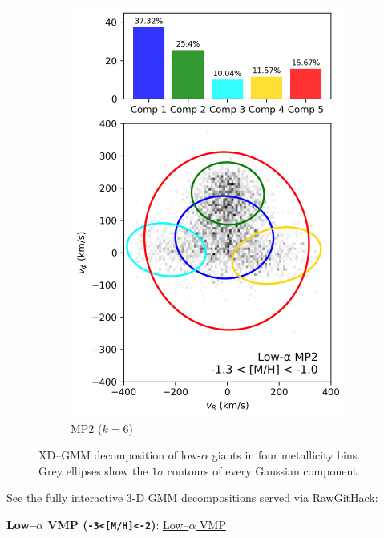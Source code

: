 \documentclass[a4paper,12pt]{article}
\begin{document}
\begin{figure}[H]
\begin{subfigure}{0.24\linewidth}
    \includegraphics[width=\linewidth]{../figures/gmm_mp2_low_alpha_k6.png}
    \caption{MP2 ($k{=}6$)}
    \label{fig:gmm_mp2_lo}
  \end{subfigure}

  \caption{XD–GMM decomposition of low-$\alpha$ giants in four metallicity
           bins.  Grey ellipses show the $1\sigma$ contours of every Gaussian component.}
  \label{fig:gmm_lowalpha_panel}
\end{figure}

See the fully interactive 3-D GMM decompositions served via RawGitHack:\medskip

\noindent\textbf{Low–$\alpha$ VMP (\texttt{-3<[M/H]<-2})}:  
\href{https://raw.githack.com/raunaq-rai/Disentangling-the-Milky-Way-using-GMM/main/figures/VMP_low____-3%5BM_H%5D-2.html}{Low–$\alpha$ VMP}
\end{document}
